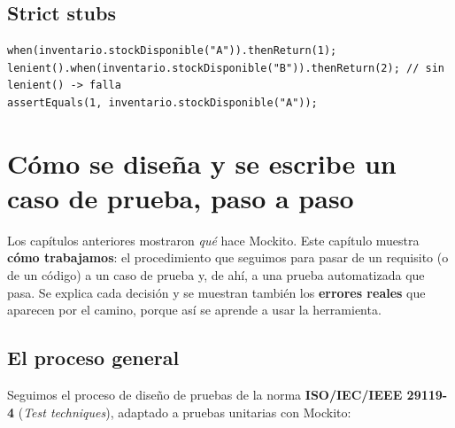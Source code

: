 \documentclass[11pt,a4paper,oneside]{report}
\newcommand{\code}[1]{\texttt{#1}}
\begin{document}
\section{Strict stubs}
\begin{lstlisting}[caption={\code{E08\_StrictStubsTest} (extracto)}]
when(inventario.stockDisponible("A")).thenReturn(1);
lenient().when(inventario.stockDisponible("B")).thenReturn(2); // sin lenient() -> falla
assertEquals(1, inventario.stockDisponible("A"));
\end{lstlisting}

\chapter{Cómo se diseña y se escribe un caso de prueba, paso a paso}
\label{cap:proceso}

Los capítulos anteriores mostraron \emph{qué} hace Mockito. Este capítulo muestra \textbf{cómo trabajamos}: el procedimiento que seguimos para pasar de un requisito (o de un código) a un caso de prueba y, de ahí, a una prueba automatizada que pasa. Se explica cada decisión y se muestran también los \textbf{errores reales} que aparecen por el camino, porque así se aprende a usar la herramienta.

\section{El proceso general}
Seguimos el proceso de diseño de pruebas de la norma \textbf{ISO/IEC/IEEE 29119-4} (\emph{Test techniques}), adaptado a pruebas unitarias con Mockito:
\end{document}
